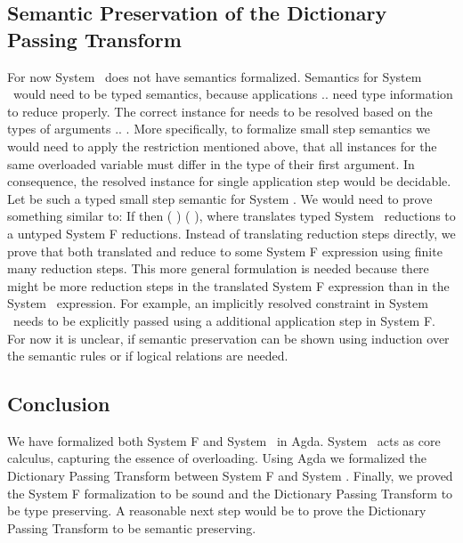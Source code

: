 \subsection{Semantic Preservation of the Dictionary Passing Transform}
For now System \Fo\ does not have semantics formalized.
Semantics for System \Fo\ would need to be typed semantics, because applications     $..$   need type information to reduce properly.
The correct instance for  needs to be resolved based on the types of arguments  $..$ . 
More specifically, to formalize small step semantics we would need to apply the restriction mentioned above, that all instances for the same overloaded variable  must differ in the type of their first argument. 
In consequence, the resolved instance for single application step     would be decidable.
Let    be such a typed small step semantic for System \Fo. We would need to prove something similar to: If    then  \Constr{[}  \Constr{]} (   )  (   ), where  translates typed System \Fo\ reductions to a untyped System F reductions.
Instead of translating reduction steps directly, we prove that both translated  and  reduce to some System F expression  using finite many reduction steps.
This more general formulation is needed because there might be more reduction steps in the translated System F expression than in the System \Fo\ expression. 
For example, an implicitly resolved constraint in System \Fo\ needs to be explicitly passed using a additional application step in System F. 
For now it is unclear, if semantic preservation can be shown using induction over the semantic rules or if logical relations are needed.

\subsection{Conclusion}
We have formalized both System F and System \Fo\ in Agda. 
System \Fo\ acts as core calculus, capturing the essence of overloading.
Using Agda we formalized the Dictionary Passing Transform between System F and System \Fo. 
Finally, we proved the System F formalization to be sound and the Dictionary Passing Transform to be type preserving. A reasonable next step would be to prove the Dictionary Passing Transform to be semantic preserving.